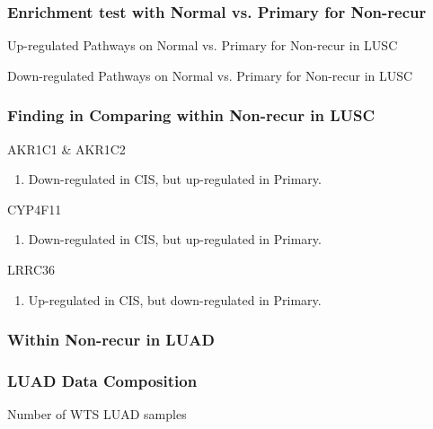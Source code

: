 \documentclass{beamer}
\begin{document}
    \begin{frame}
        \frametitle{Enrichment test with Normal vs. Primary for Non-recur}

        \begin{table}
            \caption{Up-regulated Pathways on Normal vs. Primary for Non-recur in LUSC}
            \resizebox{\linewidth}{!}
            {}
        \end{table}

        \begin{table}
            \caption{Down-regulated Pathways on Normal vs. Primary for Non-recur in LUSC}
            \resizebox{\linewidth}{!}
            {}
        \end{table}
    \end{frame}

    \begin{frame}[allowframebreaks]
        \frametitle{Finding in Comparing within Non-recur in LUSC}

        \begin{block}{AKR1C1 \& AKR1C2}
            \begin{enumerate}
                \item Down-regulated in CIS, but up-regulated in Primary.
            \end{enumerate}
        \end{block}

        \begin{block}{CYP4F11}
            \begin{enumerate}
                \item Down-regulated in CIS, but up-regulated in Primary.
            \end{enumerate}
        \end{block}

        \begin{block}{LRRC36}
            \begin{enumerate}
                \item Up-regulated in CIS, but down-regulated in Primary.
            \end{enumerate}
        \end{block}
    \end{frame}

    \subsubsection{Within Non-recur in LUAD}
    \begin{frame}
        \frametitle{LUAD Data Composition}

        \begin{table}
            \caption{Number of WTS LUAD samples}
            
        \end{table}
    \end{frame}
\end{document}
